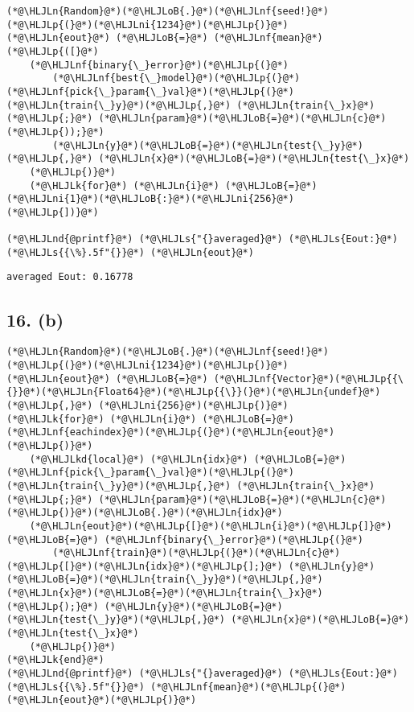 \documentclass[12pt,a4paper]{article}
\newcommand{\HLJLk}[1]{\textcolor[RGB]{148,91,176}{\textbf{#1}}}
\newcommand{\HLJLkd}[1]{\textcolor[RGB]{214,102,97}{\textit{#1}}}
\newcommand{\HLJLn}[1]{#1}
\newcommand{\HLJLnd}[1]{\textcolor[RGB]{214,102,97}{#1}}
\newcommand{\HLJLnf}[1]{\textcolor[RGB]{66,102,213}{#1}}
\newcommand{\HLJLs}[1]{\textcolor[RGB]{201,61,57}{#1}}
\newcommand{\HLJLni}[1]{\textcolor[RGB]{59,151,46}{#1}}
\newcommand{\HLJLoB}[1]{\textcolor[RGB]{102,102,102}{\textbf{#1}}}
\newcommand{\HLJLp}[1]{#1}
\begin{document}
\begin{lstlisting}
(*@\HLJLn{Random}@*)(*@\HLJLoB{.}@*)(*@\HLJLnf{seed!}@*)(*@\HLJLp{(}@*)(*@\HLJLni{1234}@*)(*@\HLJLp{)}@*)
(*@\HLJLn{eout}@*) (*@\HLJLoB{=}@*) (*@\HLJLnf{mean}@*)(*@\HLJLp{([}@*)
    (*@\HLJLnf{binary{\_}error}@*)(*@\HLJLp{(}@*)
        (*@\HLJLnf{best{\_}model}@*)(*@\HLJLp{(}@*)(*@\HLJLnf{pick{\_}param{\_}val}@*)(*@\HLJLp{(}@*)(*@\HLJLn{train{\_}y}@*)(*@\HLJLp{,}@*) (*@\HLJLn{train{\_}x}@*)(*@\HLJLp{;}@*) (*@\HLJLn{param}@*)(*@\HLJLoB{=}@*)(*@\HLJLn{c}@*)(*@\HLJLp{));}@*)
        (*@\HLJLn{y}@*)(*@\HLJLoB{=}@*)(*@\HLJLn{test{\_}y}@*)(*@\HLJLp{,}@*) (*@\HLJLn{x}@*)(*@\HLJLoB{=}@*)(*@\HLJLn{test{\_}x}@*)
    (*@\HLJLp{)}@*)
    (*@\HLJLk{for}@*) (*@\HLJLn{i}@*) (*@\HLJLoB{=}@*) (*@\HLJLni{1}@*)(*@\HLJLoB{:}@*)(*@\HLJLni{256}@*)
(*@\HLJLp{])}@*)

(*@\HLJLnd{@printf}@*) (*@\HLJLs{"{}averaged}@*) (*@\HLJLs{Eout:}@*) (*@\HLJLs{{\%}.5f"{}}@*) (*@\HLJLn{eout}@*)
\end{lstlisting}

\begin{lstlisting}
averaged Eout: 0.16778
\end{lstlisting}


\subsection{16. (b)}

\begin{lstlisting}
(*@\HLJLn{Random}@*)(*@\HLJLoB{.}@*)(*@\HLJLnf{seed!}@*)(*@\HLJLp{(}@*)(*@\HLJLni{1234}@*)(*@\HLJLp{)}@*)
(*@\HLJLn{eout}@*) (*@\HLJLoB{=}@*) (*@\HLJLnf{Vector}@*)(*@\HLJLp{{\{}}@*)(*@\HLJLn{Float64}@*)(*@\HLJLp{{\}}(}@*)(*@\HLJLn{undef}@*)(*@\HLJLp{,}@*) (*@\HLJLni{256}@*)(*@\HLJLp{)}@*)
(*@\HLJLk{for}@*) (*@\HLJLn{i}@*) (*@\HLJLoB{=}@*) (*@\HLJLnf{eachindex}@*)(*@\HLJLp{(}@*)(*@\HLJLn{eout}@*)(*@\HLJLp{)}@*)
    (*@\HLJLkd{local}@*) (*@\HLJLn{idx}@*) (*@\HLJLoB{=}@*) (*@\HLJLnf{pick{\_}param{\_}val}@*)(*@\HLJLp{(}@*)(*@\HLJLn{train{\_}y}@*)(*@\HLJLp{,}@*) (*@\HLJLn{train{\_}x}@*)(*@\HLJLp{;}@*) (*@\HLJLn{param}@*)(*@\HLJLoB{=}@*)(*@\HLJLn{c}@*)(*@\HLJLp{)}@*)(*@\HLJLoB{.}@*)(*@\HLJLn{idx}@*)
    (*@\HLJLn{eout}@*)(*@\HLJLp{[}@*)(*@\HLJLn{i}@*)(*@\HLJLp{]}@*) (*@\HLJLoB{=}@*) (*@\HLJLnf{binary{\_}error}@*)(*@\HLJLp{(}@*)
        (*@\HLJLnf{train}@*)(*@\HLJLp{(}@*)(*@\HLJLn{c}@*)(*@\HLJLp{[}@*)(*@\HLJLn{idx}@*)(*@\HLJLp{];}@*) (*@\HLJLn{y}@*)(*@\HLJLoB{=}@*)(*@\HLJLn{train{\_}y}@*)(*@\HLJLp{,}@*) (*@\HLJLn{x}@*)(*@\HLJLoB{=}@*)(*@\HLJLn{train{\_}x}@*)(*@\HLJLp{);}@*) (*@\HLJLn{y}@*)(*@\HLJLoB{=}@*)(*@\HLJLn{test{\_}y}@*)(*@\HLJLp{,}@*) (*@\HLJLn{x}@*)(*@\HLJLoB{=}@*)(*@\HLJLn{test{\_}x}@*)
    (*@\HLJLp{)}@*)
(*@\HLJLk{end}@*)
(*@\HLJLnd{@printf}@*) (*@\HLJLs{"{}averaged}@*) (*@\HLJLs{Eout:}@*) (*@\HLJLs{{\%}.5f"{}}@*) (*@\HLJLnf{mean}@*)(*@\HLJLp{(}@*)(*@\HLJLn{eout}@*)(*@\HLJLp{)}@*)
\end{lstlisting}
\end{document}
